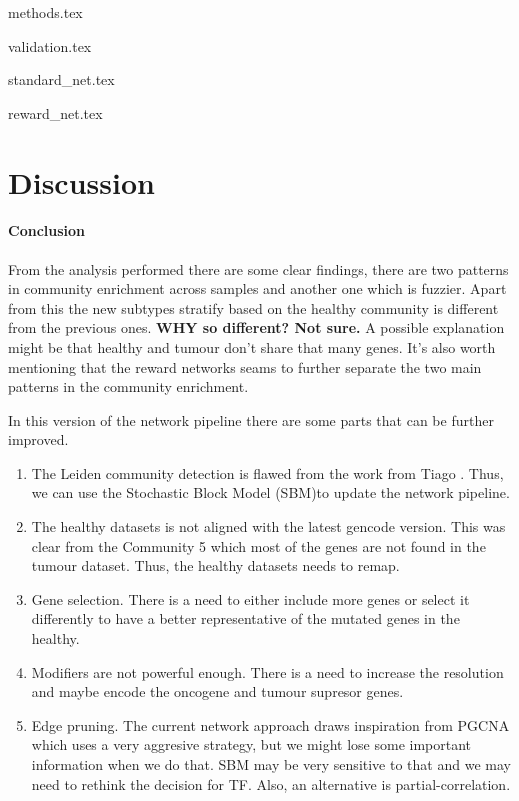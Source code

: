 {methods.tex}

{validation.tex}

{standard_net.tex}

{reward_net.tex}

\section{Discussion}

\paragraph*{Conclusion}







From the analysis performed there are some clear findings, there are two patterns in community enrichment across samples and another one which is fuzzier. Apart from this the new subtypes stratify based on the healthy community is different from the previous ones. \textbf{WHY so different? Not sure.} A possible explanation might be that healthy and tumour don't share that many genes. It's also worth mentioning that the reward networks seams to further separate the two main patterns in the community enrichment.

In this version of the network pipeline there are some parts that can be further improved.
\begin{enumerate}
    \item The Leiden community detection is flawed from the work from Tiago \cite{Peixoto2021-jx,Fortunato2016-tj}. Thus, we can use the Stochastic Block Model (SBM)\cite{Peixoto2017-ua}to update the network pipeline.
    \item The healthy datasets is not aligned with the latest gencode version. This was clear from the Community 5 which most of the genes are not found in the tumour dataset. Thus, the healthy datasets needs to remap.
    \item Gene selection. There is a need to either include more genes or select it differently to have a better representative of the mutated genes in the healthy.
    \item Modifiers are not powerful enough. There is a need to increase the resolution and maybe encode the oncogene and tumour supresor genes.
    \item Edge pruning. The current network approach draws inspiration from PGCNA which uses a very aggresive strategy, but we might lose some important information when we do that. SBM may be very sensitive to that and we may need to rethink the decision for TF. Also, an alternative is partial-correlation.
\end{enumerate}


